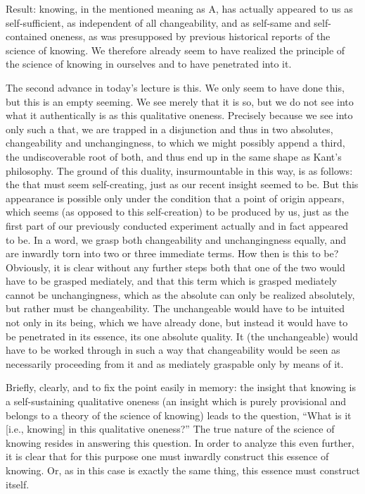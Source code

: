 Result: knowing, in the mentioned meaning as A, has actually appeared
to us as self-sufficient, as independent of all changeability,
and as self-same and self-contained oneness, as was presupposed by
previous historical reports of the science of knowing.
We therefore already seem to have realized
the principle of the science of knowing in ourselves
and to have penetrated into it.

The second advance in today's lecture is this.
We only seem to have done this, but this is an empty seeming.
We see merely that it is so, but we do not see into
what it authentically is as this qualitative oneness.
Precisely because we see into only such a that,
we are trapped in a disjunction and thus in two absolutes,
changeability and unchangingness, to which we
might possibly append a third, the undiscoverable root of both,
and thus end up in the same shape as Kant's philosophy.
The ground of this duality, insurmountable in this way, is as follows:
the that must seem self-creating, just as our recent insight seemed to be.
But this appearance is possible only under the
condition that a point of origin appears,
which seems (as opposed to this self-creation) to be produced by us,
just as the first part of our previously conducted experiment actually
and in fact appeared to be.
In a word, we grasp both changeability and unchangingness equally, and
are inwardly torn into two or three immediate terms.
How then is this to be?
Obviously, it is clear without any further steps both that
one of the two would have to be grasped mediately,
and that this term which is grasped mediately cannot be
unchangingness, which as the absolute can only be realized absolutely,
but rather must be changeability.
The unchangeable would have to be intuited not only in its being,
which we have already done, but instead it would have
to be penetrated in its essence, its one absolute quality.
It (the unchangeable) would have to be worked through in such a way
that changeability would be seen as necessarily proceeding from it
and as mediately graspable only by means of it.

Briefly, clearly, and to fix the point easily in memory:
the insight that knowing is a self-sustaining qualitative oneness
(an insight which is purely provisional and belongs to
a theory of the science of knowing) leads to the question,
“What is it [i.e., knowing] in this qualitative oneness?”
The true nature of the science of knowing resides in answering this question.
In order to analyze this even further, it is clear that
for this purpose one must inwardly construct this essence of knowing.
Or, as in this case is exactly the same thing,
this essence must construct itself.

